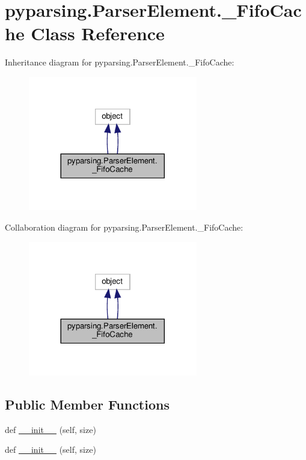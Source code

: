 \hypertarget{classpyparsing_1_1ParserElement_1_1__FifoCache}{}\section{pyparsing.\+Parser\+Element.\+\_\+\+Fifo\+Cache Class Reference}
\label{classpyparsing_1_1ParserElement_1_1__FifoCache}


Inheritance diagram for pyparsing.\+Parser\+Element.\+\_\+\+Fifo\+Cache\+:
\nopagebreak
\begin{figure}[H]
\begin{center}
\leavevmode
\includegraphics[width=209pt]{classpyparsing_1_1ParserElement_1_1__FifoCache__inherit__graph}
\end{center}
\end{figure}


Collaboration diagram for pyparsing.\+Parser\+Element.\+\_\+\+Fifo\+Cache\+:
\nopagebreak
\begin{figure}[H]
\begin{center}
\leavevmode
\includegraphics[width=209pt]{classpyparsing_1_1ParserElement_1_1__FifoCache__coll__graph}
\end{center}
\end{figure}
\subsection*{Public Member Functions}
\begin{DoxyCompactItemize}
\item 
def \hyperlink{classpyparsing_1_1ParserElement_1_1__FifoCache_ad5509dbec9717c17e99ae33657c22cce}{\+\_\+\+\_\+init\+\_\+\+\_\+} (self, size)
\item 
def \hyperlink{classpyparsing_1_1ParserElement_1_1__FifoCache_ad5509dbec9717c17e99ae33657c22cce}{\+\_\+\+\_\+init\+\_\+\+\_\+} (self, size)
\end{DoxyCompactItemize}
